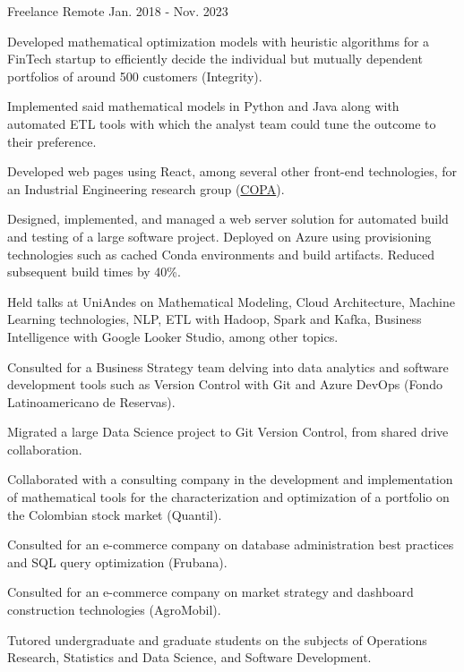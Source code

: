 \begin{cventries}
	{Freelance} %
	{Remote} %
	{Jan. 2018 {-} Nov. 2023} %
	{
		\begin{cvitems} %
			\item {Developed mathematical optimization models with heuristic algorithms for a FinTech startup to efficiently decide the individual but mutually dependent portfolios of around 500 customers (Integrity).}
			\item {Implemented said mathematical models in Python and Java along with automated ETL tools with which the analyst team could tune the outcome to their preference.}
			\item {Developed web pages using React, among several other front-end technologies, for an Industrial Engineering research group (\href{https://copa.uniandes.edu.co/en/}{COPA}).}
			\item {Designed, implemented, and managed a web server solution for automated build and testing of a large software project. Deployed on Azure using provisioning technologies such as cached Conda environments and build artifacts. Reduced subsequent build times by 40\%.}
			\item {Held talks at UniAndes on Mathematical Modeling, Cloud Architecture, Machine Learning technologies, NLP, ETL with Hadoop, Spark and Kafka, Business Intelligence with Google Looker Studio, among other topics.}
			\item {Consulted for a Business Strategy team delving into data analytics and software development tools such as Version Control with Git and Azure DevOps (Fondo Latinoamericano de Reservas).}
			\item {Migrated a large Data Science project to Git Version Control, from shared drive collaboration.}
			\item {Collaborated with a consulting company in the development and implementation of mathematical tools for the characterization and optimization of a portfolio on the Colombian stock market (Quantil).}
			\item {Consulted for an e-commerce company on database administration best practices and SQL query optimization (Frubana).}
			\item {Consulted for an e-commerce company on market strategy and dashboard construction technologies (AgroMobil).}
			\item {Tutored undergraduate and graduate students on the subjects of Operations Research, Statistics and Data Science, and Software Development.}
		\end{cvitems}
	}


\end{cventries}

